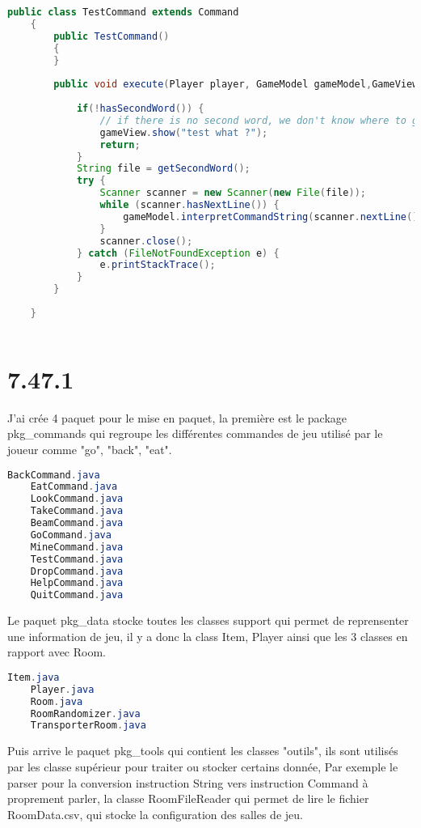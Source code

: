 \documentclass[a4paper , 10pt]{article}
\begin{document}
\begin{lstlisting}[language=Java, caption={Testcommand}]
    public class TestCommand extends Command
    {
        public TestCommand()
        {
        }
    
        public void execute(Player player, GameModel gameModel,GameView gameView){
    
            if(!hasSecondWord()) {
                // if there is no second word, we don't know where to go...
                gameView.show("test what ?");
                return;
            }
            String file = getSecondWord();
            try {
                Scanner scanner = new Scanner(new File(file));
                while (scanner.hasNextLine()) {
                    gameModel.interpretCommandString(scanner.nextLine());
                }
                scanner.close();
            } catch (FileNotFoundException e) {
                e.printStackTrace();
            }
        }
        
    }
    
\end{lstlisting}

\section{7.47.1}
J'ai crée 4 paquet pour le mise en paquet, la première est le package pkg\_commands qui regroupe les 
différentes commandes de jeu utilisé par le joueur comme "go", "back", "eat".
\begin{lstlisting}[language=Java, caption={pkg\_commands}]
    BackCommand.java
    EatCommand.java
    LookCommand.java
    TakeCommand.java
    BeamCommand.java
    GoCommand.java
    MineCommand.java
    TestCommand.java
    DropCommand.java
    HelpCommand.java
    QuitCommand.java
\end{lstlisting}

Le paquet pkg\_data stocke toutes les classes support qui permet de reprensenter une information de jeu, il y a donc la class Item,
Player ainsi que les 3 classes en rapport avec Room.
\begin{lstlisting}[language=Java, caption={pkg\_data}]
    Item.java  
    Player.java  
    Room.java  
    RoomRandomizer.java  
    TransporterRoom.java
\end{lstlisting}

Puis arrive le paquet pkg\_tools qui contient les classes "outils", ils sont utilisés par les classe supérieur pour traiter ou stocker certains donnée,
Par exemple le parser pour la conversion instruction String vers instruction Command à proprement parler, 
la classe RoomFileReader qui permet de lire le fichier RoomData.csv, qui stocke la configuration des salles de jeu.
\end{document}
